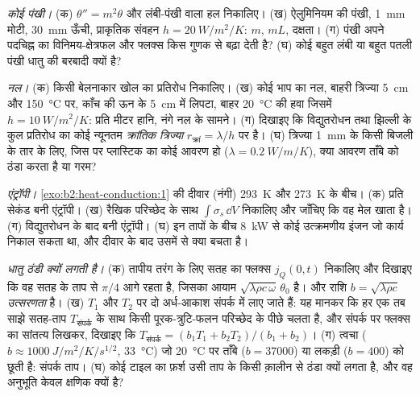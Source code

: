 \begin{exercise}[$\star\star$]\label{exo:b2:heat-conduction:8}
\emph{कोई पंखी।} (क) $\theta'' = m^2\theta$ और लंबी-पंखी वाला हल निकालिए।
(ख) ऐलुमिनियम की पंखी, \qty{1}{mm} मोटी, \qty{30}{mm} ऊँची, प्राकृतिक
संवहन $h = \qty{20}{W/m^2/K}$: $m$, $mL$, दक्षता। (ग) पंखी अपने पदचिह्न का
विनिमय-क्षेत्रफल और फ्लक्स किस गुणक से बढ़ा देती है? (घ) कोई
बहुत लंबी या बहुत पतली पंखी धातु की बरबादी क्यों है?
\end{exercise}

\begin{exercise}[$\star\star$]\label{exo:b2:heat-conduction:9}
\emph{नल।} (क) किसी बेलनाकार खोल का प्रतिरोध निकालिए। (ख) कोई
भाप का नल, बाहरी त्रिज्या \qty{5}{cm} और \qty{150}{\celsius} पर, काँच की ऊन के
\qty{5}{cm} में लिपटा, बाहर \qty{20}{\celsius} की हवा जिसमें $h =
\qty{10}{W/m^2/K}$: प्रति मीटर हानि, नंगे नल के सामने।
(ग) दिखाइए कि विद्युतरोधन तथा झिल्ली के कुल प्रतिरोध का कोई
न्यूनतम \emph{क्रांतिक त्रिज्या} $r_{\text{क्रां}} = \lambda/h$ पर है। (घ) त्रिज्या
\qty{1}{mm} के किसी बिजली के तार के लिए, जिस पर प्लास्टिक का कोई आवरण हो ($\lambda =
\qty{0.2}{W/m/K}$), क्या आवरण ताँबे को ठंडा करता है या गरम?
\end{exercise}

\begin{exercise}[$\star\star\star$]\label{exo:b2:heat-conduction:10}
\emph{एंट्रॉपी।} \cref{exo:b2:heat-conduction:1} की दीवार (नंगी)
\qty{293}{K} और \qty{273}{K} के बीच। (क) प्रति सेकंड बनी एंट्रॉपी।
(ख) रैखिक परिच्छेद के साथ $\int\sigma_s\,\dd V$ निकालिए और जाँचिए कि वह
मेल खाता है। (ग) विद्युतरोधन के बाद बनी एंट्रॉपी। (घ) इन तापों के बीच
\qty{8}{kW} से कोई उत्क्रमणीय इंजन जो कार्य निकाल सकता था, और
दीवार के बाद उसमें से क्या बचता है।
\end{exercise}

\begin{exercise}[$\star\star\star$]\label{exo:b2:heat-conduction:11}
\emph{धातु ठंडी क्यों लगती है।} (क) तापीय तरंग के लिए
सतह का फ्लक्स $j_Q(0,t)$ निकालिए और दिखाइए कि वह सतह के ताप से
$\pi/4$ आगे रहता है, जिसका आयाम $\sqrt{\lambda\rho c\,\omega}\,\theta_0$ है। और
राशि $b = \sqrt{\lambda\rho c}$ \emph{उत्सरणता} है। (ख) $T_1$ और $T_2$ पर दो
अर्ध-आकाश संपर्क में लाए जाते हैं: यह मानकर कि
हर एक तब साझे सतह-ताप $T_{\text{संपर्क}}$ के साथ किसी पूरक-त्रुटि-फलन परिच्छेद के पीछे चलता है,
और संपर्क पर फ्लक्स का सांतत्य लिखकर,
दिखाइए कि $T_{\text{संपर्क}} = (b_1T_1 + b_2T_2)/(b_1 + b_2)$। (ग) त्वचा
($b \approx \qty{1000}{J/m^2/K/s^{1/2}}$, \qty{33}{\celsius}) जो \qty{20}{\celsius} पर
ताँबे ($b = 37000$) या लकड़ी ($b = 400$) को छूती है: संपर्क
ताप। (घ) कोई टाइल का फ़र्श उसी ताप के किसी क़ालीन से ठंडा क्यों लगता है,
और वह अनुभूति केवल क्षणिक क्यों है?
\end{exercise}

